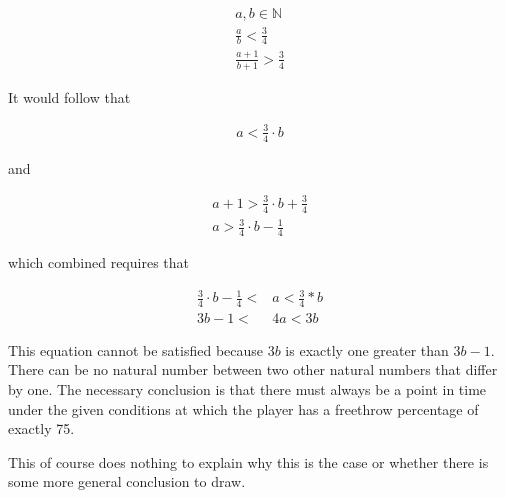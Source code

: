 \documentclass{article}
\begin{document}
\begin{align*}
    a, b \in \mathbb{N} \\
    \frac{a}{b} < \frac{3}{4} \\
    \frac{a + 1}{b + 1} > \frac{3}{4}
\end{align*}

It would follow that

\begin{align*}
    a < \frac{3}{4} \cdot b
\end{align*}

and

\begin{align*}
    a + 1 > \frac{3}{4} \cdot b + \frac{3}{4} \\
    a > \frac{3}{4} \cdot b - \frac{1}{4}
\end{align*}

which combined requires that

\begin{align*}
    \frac{3}{4} \cdot b - \frac{1}{4} < &a < \frac{3}{4} * b \\
    3b - 1 < &4a < 3b
\end{align*}

This equation cannot be satisfied because $3b$ is exactly
one greater than $3b - 1$.  There can be no natural number
between two other natural numbers that differ by one.
The necessary conclusion is that there must always be a
point in time under the given conditions at which the player
has a freethrow percentage of exactly 75.

\par

This of course does nothing to explain why this is the case
or whether there is some more general conclusion to draw.
\end{document}
